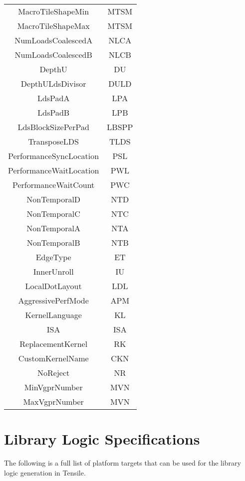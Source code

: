 \documentclass[]{article}
\begin{document}
\begin{center}
\begin{small}
\begin{longtable}{ |c|c| }
 MacroTileShapeMin & MTSM \\
 MacroTileShapeMax & MTSM \\
 NumLoadsCoalescedA & NLCA \\
 NumLoadsCoalescedB & NLCB \\
 DepthU & DU \\
 DepthULdsDivisor & DULD \\
 LdsPadA & LPA \\
 LdsPadB & LPB \\
 LdsBlockSizePerPad & LBSPP \\
 TransposeLDS & TLDS \\
 PerformanceSyncLocation & PSL \\
 PerformanceWaitLocation & PWL \\
 PerformanceWaitCount & PWC \\
 NonTemporalD & NTD \\
 NonTemporalC & NTC \\
 NonTemporalA & NTA \\
 NonTemporalB & NTB \\
 EdgeType & ET \\
 InnerUnroll & IU \\
 LocalDotLayout & LDL \\
 AggressivePerfMode & APM \\
 KernelLanguage & KL \\
 ISA & ISA \\
 ReplacementKernel & RK \\
 CustomKernelName & CKN \\
 NoReject & NR \\
 MinVgprNumber & MVN \\
 MaxVgprNumber & MVN \\
 \hline
\end{longtable}
\end{small}
\end{center}

\section{Library Logic Specifications}
\label{sec:appendixD}

The following is a full list of platform targets that can be used for the library logic generation in Tensile.
\end{document}
